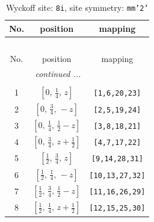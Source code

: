 \documentclass[fleqn,8pt]{jsarticle}
\begin{document}
\begin{longtable}{ccc}
\caption{Wyckoff site: {\tt 8i}, site symmetry: {\tt mm'2'}}
 \\
 \hline \hline
No. & position & mapping \\ \hline \endfirsthead

\multicolumn{2}{l}{\tablename\ \thetable{}} \\
 \hline \hline
No. & position & mapping \\ \hline \endhead

 \hline \hline
\multicolumn{2}{r}{\footnotesize\it continued ...} \\ \endfoot

 \hline \hline
\multicolumn{2}{r}{} \\ \endlastfoot

1 & $\left[ 0,\, \frac{1}{4},\, z \right]$ & {\tt [1,6,20,23]} \\ \hline
2 & $\left[ 0,\, \frac{3}{4},\, - z \right]$ & {\tt [2,5,19,24]} \\ \hline
3 & $\left[ 0,\, \frac{1}{4},\, \frac{1}{2} - z \right]$ & {\tt [3,8,18,21]} \\ \hline
4 & $\left[ 0,\, \frac{3}{4},\, z + \frac{1}{2} \right]$ & {\tt [4,7,17,22]} \\ \hline
5 & $\left[ \frac{1}{2},\, \frac{3}{4},\, z \right]$ & {\tt [9,14,28,31]} \\ \hline
6 & $\left[ \frac{1}{2},\, \frac{1}{4},\, - z \right]$ & {\tt [10,13,27,32]} \\ \hline
7 & $\left[ \frac{1}{2},\, \frac{3}{4},\, \frac{1}{2} - z \right]$ & {\tt [11,16,26,29]} \\ \hline
8 & $\left[ \frac{1}{2},\, \frac{1}{4},\, z + \frac{1}{2} \right]$ & {\tt [12,15,25,30]} \\
\end{longtable}
\renewcommand{\arraystretch}{1.2}
\end{document}
